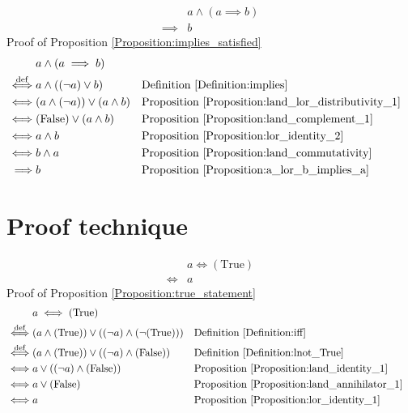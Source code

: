 \begin{prop}
\label{Proposition:implies_satisfied}
\begin{align*}
& a \land (a \implies b) \\
\implies & b
\end{align*}
Proof of Proposition \ref{Proposition:implies_satisfied}
\begin{align*}
& a \land (a \implies b) \\
\overset{\operatorname{def}}{\iff} & a \land ((\lnot a) \lor b)
& & \text{Definition \ref{Definition:implies}} \\
\iff & (a \land (\lnot a)) \lor (a \land b)
& & \text{Proposition \ref{Proposition:land_lor_distributivity_1}} \\
\iff & (\text{False}) \lor (a \land b)
& & \text{Proposition \ref{Proposition:land_complement_1}} \\
\iff & a \land b
& & \text{Proposition \ref{Proposition:lor_identity_2}} \\
\iff & b \land a
& & \text{Proposition \ref{Proposition:land_commutativity}} \\
\implies & b
& & \text{Proposition \ref{Proposition:a_lor_b_implies_a}} \\
\end{align*}
\end{prop}

\section{Proof technique}
\begin{prop}
\label{Proposition:true_statement}
\begin{align*}
& a \iff (\text{True}) \\
\iff & a
\end{align*}
Proof of Proposition \ref{Proposition:true_statement}
\begin{align*}
& a \iff (\text{True}) \\
\overset{\operatorname{def}}{\iff} & (a \land (\text{True})) \lor ((\lnot a) \land (\lnot (\text{True})))
& & \text{Definition \ref{Definition:iff}} \\
\overset{\operatorname{def}}{\iff} & (a \land (\text{True})) \lor ((\lnot a) \land (\text{False}))
& & \text{Definition \ref{Definition:lnot_True}} \\
\iff & a \lor ((\lnot a) \land (\text{False}))
& & \text{Proposition \ref{Proposition:land_identity_1}} \\
\iff & a \lor (\text{False})
& & \text{Proposition \ref{Proposition:land_annihilator_1}} \\
\iff & a
& & \text{Proposition \ref{Proposition:lor_identity_1}} \\
\end{align*}
\end{prop}

